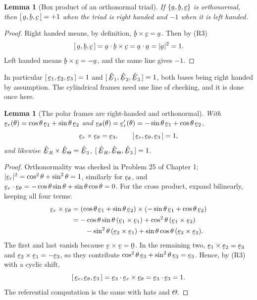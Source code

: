 \documentclass[17pt,a4paper]{extreport}
\DeclareRobustCommand{\vek}[1]{\underaccent{\tilde}{#1}}
\newcommand{\ba}{\vek{a}}
\newcommand{\bb}{\vek{b}}
\newcommand{\bc}{\vek{c}}
\newcommand{\bv}{\vek{v}}
\newcommand{\bze}{\vek{0}}
\newcommand{\be}{\vek{e}}
\newcommand{\hbE}{\hat{\vek{E}}}
\newcommand{\ber}{\vek{e}_{r}}
\newcommand{\bet}{\vek{e}_{\theta}}
\newcommand{\hER}{\hat{\vek{E}}_{R}}
\newcommand{\hETh}{\hat{\vek{E}}_{\Theta}}
\newcommand{\tbox}[3]{[\,#1,#2,#3\,]}
\newcommand{\ip}[2]{#1\cdot#2}
\theoremstyle{scplain}
\newtheorem{lemma}[theorem]{Lemma}
\theoremstyle{scdefn}
\begin{document}
\begin{lemma}[Box product of an orthonormal triad]\label{lem:boxortho}
If $\{\ba,\bb,\bc\}$ is orthonormal, then $\tbox\ba\bb\bc=+1$ when the
triad is right handed and $-1$ when it is left handed.
\end{lemma}

\begin{proof}
Right handed means, by definition, $\bb\times\bc=\ba$. Then by (R3)
\[
   \tbox\ba\bb\bc=\ip{\ba}{\bb\times\bc}=\ip\ba\ba=|\ba|^{2}=1 .
\]
Left handed means $\bb\times\bc=-\ba$, and the same line gives $-1$.
\end{proof}

In particular $\tbox{\be_{1}}{\be_{2}}{\be_{3}}=1$ and
$\tbox{\hbE_{1}}{\hbE_{2}}{\hbE_{3}}=1$, both bases being right handed by
assumption. The cylindrical frames need one line of checking, and it is
done once here.

\begin{lemma}[The polar frames are right-handed and orthonormal]
\label{lem:polarframe}
With $\ber(\theta)=\cos\theta\,\be_{1}+\sin\theta\,\be_{2}$ and
$\bet(\theta)=\ber'(\theta)=-\sin\theta\,\be_{1}+\cos\theta\,\be_{2}$,
\[
   \ber\times\bet=\be_{3},\qquad
   \tbox{\ber}{\bet}{\be_{3}}=1 ,
\]
and likewise $\hER\times\hETh=\hbE_{3}$,
$\tbox{\hER}{\hETh}{\hbE_{3}}=1$.
\end{lemma}

\begin{proof}
Orthonormality was checked in Problem 25 of Chapter 1;
$|\ber|^{2}=\cos^{2}\theta+\sin^{2}\theta=1$, similarly for $\bet$, and
$\ip\ber\bet=-\cos\theta\sin\theta+\sin\theta\cos\theta=0$. For the cross
product, expand bilinearly, keeping all four terms:
\[
\begin{aligned}
   \ber\times\bet
   &=(\cos\theta\,\be_{1}+\sin\theta\,\be_{2})
     \times(-\sin\theta\,\be_{1}+\cos\theta\,\be_{2})\\
   &=-\cos\theta\sin\theta\,(\be_{1}\times\be_{1})
     +\cos^{2}\theta\,(\be_{1}\times\be_{2})\\
   &\qquad-\sin^{2}\theta\,(\be_{2}\times\be_{1})
     +\sin\theta\cos\theta\,(\be_{2}\times\be_{2}).
\end{aligned}
\]
The first and last vanish because $\bv\times\bv=\bze$. In the remaining
two, $\be_{1}\times\be_{2}=\be_{3}$ and $\be_{2}\times\be_{1}=-\be_{3}$,
so they contribute $\cos^{2}\theta\,\be_{3}+\sin^{2}\theta\,\be_{3}
=\be_{3}$. Hence, by (R3) with a cyclic shift,
\[
   \tbox{\ber}{\bet}{\be_{3}}=\ip{\be_{3}}{\ber\times\bet}
   =\ip{\be_{3}}{\be_{3}}=1 .
\]
The referential computation is the same with hats and $\Theta$.
\end{proof}
\end{document}
